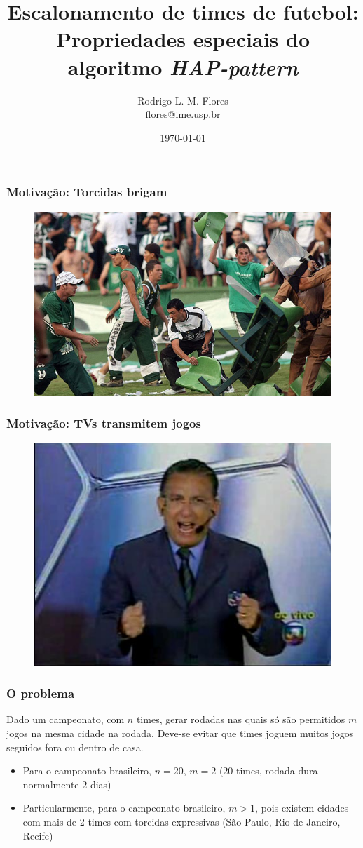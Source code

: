 \documentclass{beamer}
\title{Escalonamento de times de futebol: Propriedades especiais do algoritmo \textit{HAP-pattern}}
\author{Rodrigo L. M. Flores \\ \url{flores@ime.usp.br}}
\institute{Instituto de Matemática e Estatística\\Universidade de São Paulo}
\begin{document}
\date{\today}

\frame{\titlepage}

\begin{frame}
  \frametitle{Motivação: Torcidas brigam}
  \begin{figure}
    \includegraphics[scale=0.3]{torcida.jpg}
  \end{figure}
\end{frame}


\begin{frame}
  \frametitle{Motivação: TVs transmitem jogos}
  \begin{figure}
    \includegraphics[scale=0.5]{galvao.jpg}
  \end{figure}
\end{frame}

\begin{frame}
  \frametitle{O problema}
  Dado um campeonato, com $n$ times, gerar rodadas nas quais só são permitidos $m$ jogos 
  na mesma cidade na rodada. Deve-se evitar que times joguem muitos jogos
  seguidos fora ou dentro de casa.

  \begin{itemize}
    \item Para o campeonato brasileiro, $n = 20$, $m = 2$ ($20$ times, rodada dura normalmente $2$ dias)
    \item Particularmente, para o campeonato brasileiro, $m > 1$, pois existem cidades com mais de $2$ times com torcidas expressivas 
  (São Paulo, Rio de Janeiro, Recife)
  \end{itemize}
\end{frame}
\end{document}
